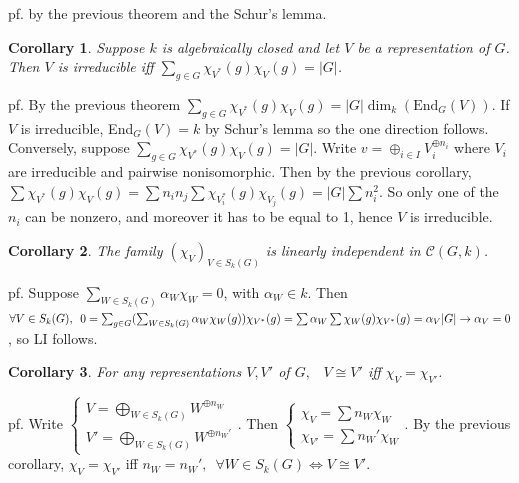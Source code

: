 \documentclass[12pt,letterpaper]{report}
\newtheorem{corollary}{Corollary}[section]
\begin{document}
pf. by the previous theorem and the Schur's lemma.
\begin{corollary}Suppose $k$ is algebraically closed and let $V$ be a representation of $G$. Then $V$ is irreducible iff $\sum_{g\in G}\chi_{V^{*}}(g)\chi_{V}(g)=|G|$.\end{corollary}
pf. By the previous theorem $\sum_{g\in G}\chi_{V^{*}}(g)\chi_{V}(g)=|G|\dim_{k}(\text{End}_{G}(V))$. If $V$ is irreducible, End$_{G}(V)=k$ by Schur's lemma so the one direction follows.
\\Conversely, suppose $\sum_{g\in G}\chi_{V^{*}}(g)\chi_{V}(g)=|G|$. Write $v=\oplus_{i\in I}V_{i}^{\oplus n_{i}}$ where $V_{i}$ are irreducible and pairwise nonisomorphic. Then by the previous corollary, $\sum\chi_{V^{*}}(g)\chi_{V}(g)=\sum n_{i}n_{j}\sum\chi_{V_{i}^{*}}(g)\chi_{V_{j}}(g)=|G|\sum n_{i}^{2}$. So only one of the $n_{i}$ can be nonzero, and moreover it has to be equal to 1, hence $V$ is irreducible.
\begin{corollary}The family $(\chi_{V})_{V\in S_{k}(G)}$ is linearly independent in $\mathcal{C}(G,k)$.\end{corollary}
pf. Suppose $\sum_{W\in S_{k}(G)}\alpha_{W}\chi_{W}=0$, with $\alpha_{W}\in k$. Then $\forall V\in S_{k}(G),\,\,\,0=\sum_{g\in G}(\sum_{W\in S_{k}(G)}\alpha_{W}\chi_{W}(g))\chi_{V^{*}}(g)\\=\sum\alpha_{W}\sum\chi_{W}(g)\chi_{V^{*}}(g)=\alpha_{V}|G|\rightarrow\alpha_{V}=0$, so LI follows.
\begin{corollary}For any representations $V,V'$ of $G,\,\,\,\,\,V\cong V'$ iff $\chi_{V}=\chi_{V'}$.\end{corollary}
pf. Write $\left\{\begin{array}{r}V=\bigoplus_{W\in S_{k}(G)}W^{\oplus n_{W}}\\V'=\bigoplus_{W\in S_{k}(G)}W^{\oplus n_{W}'}\end{array}\right.$. Then $\left\{\begin{array}{r}\chi_{V}=\sum n_{W}\chi_{W}\\\chi_{V'}=\sum n_{W}'\chi_{W}\end{array}\right.$. By the previous corollary, $\chi_{V}=\chi_{V'}$ iff $n_{W}=n_{W}',\,\,\,\forall W\in S_{k}(G)\Leftrightarrow V\cong V'$. 
\end{document}
